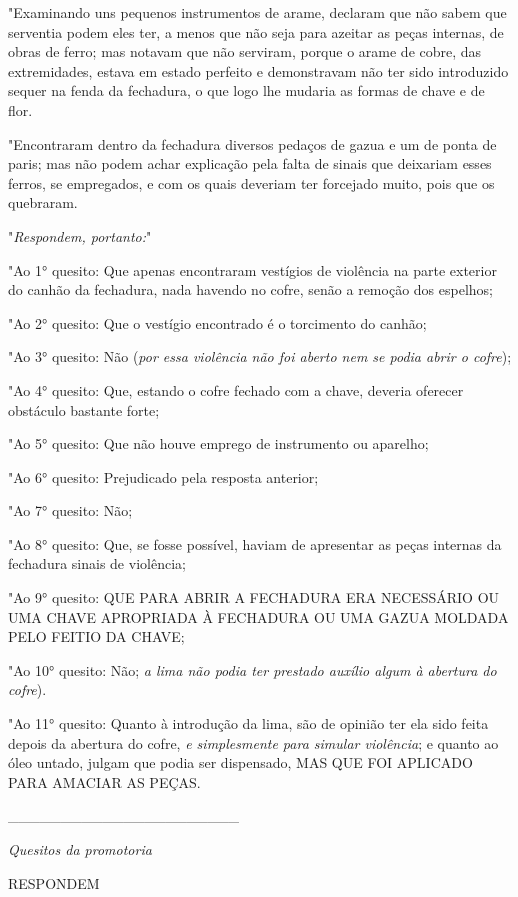 "Examinando uns pequenos instrumentos de arame, declaram que não sabem
que serventia podem eles ter, a menos que não seja para azeitar as peças
internas, de obras de ferro; mas notavam que não serviram, porque o
arame de cobre, das extremidades, estava em estado perfeito e
demonstravam não ter sido introduzido sequer na fenda da fechadura, o
que logo lhe mudaria as formas de chave e de flor.

"Encontraram dentro da fechadura diversos pedaços de gazua e um de ponta
de paris; mas não podem achar explicação pela falta de sinais que
deixariam esses ferros, se empregados, e com os quais deveriam ter
forcejado muito, pois que os quebraram.

"\emph{Respondem, portanto:}"

"Ao 1° quesito: Que apenas encontraram vestígios de violência na parte
exterior do canhão da fechadura, nada havendo no cofre, senão a remoção
dos espelhos;

"Ao 2° quesito: Que o vestígio encontrado é o torcimento do canhão;

"Ao 3° quesito: Não (\emph{por essa violência não foi aberto nem se
podia abrir o cofre});

"Ao 4° quesito: Que, estando o cofre fechado com a chave, deveria
oferecer obstáculo bastante forte;

"Ao 5° quesito: Que não houve emprego de instrumento ou aparelho;

"Ao 6° quesito: Prejudicado pela resposta anterior;

"Ao 7° quesito: Não;

"Ao 8° quesito: Que, se fosse possível, haviam de apresentar as peças
internas da fechadura sinais de violência;

"Ao 9° quesito: QUE PARA ABRIR A FECHADURA ERA NECESSÁRIO OU UMA CHAVE
APROPRIADA À FECHADURA OU UMA GAZUA MOLDADA PELO FEITIO DA CHAVE;

"Ao 10° quesito: Não; \emph{a lima não podia ter prestado auxílio algum
à abertura do cofre}).

"Ao 11° quesito: Quanto à introdução da lima, são de opinião ter ela
sido feita depois da abertura do cofre, \emph{e simplesmente para
simular violência}; e quanto ao óleo untado, julgam que podia ser
dispensado, MAS QUE FOI APLICADO PARA AMACIAR AS PEÇAS.

\_\_\_\_\_\_\_\_\_\_\_\_\_\_\_\_\_\_\_\_\_\_

\emph{Quesitos da promotoria}

RESPONDEM

